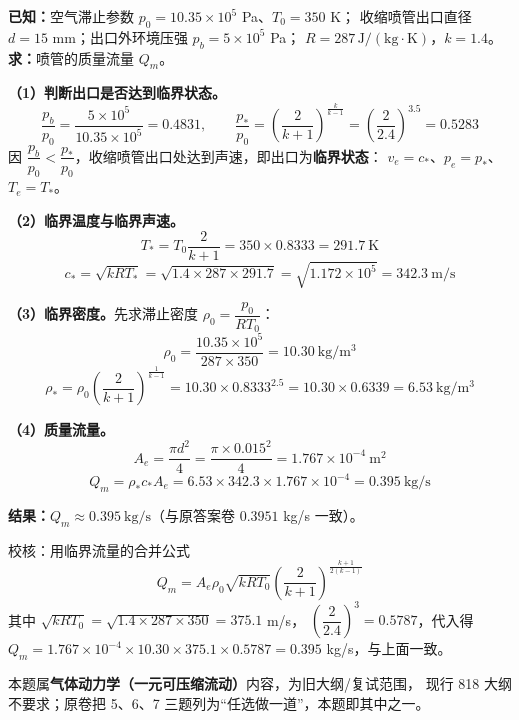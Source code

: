 \begin{jie}
\textbf{已知：}空气滞止参数 $p_0=10.35\times10^{5}$ Pa、$T_0=350$ K；
收缩喷管出口直径 $d=15$ mm；出口外环境压强 $p_b=5\times10^{5}$ Pa；
$R=287\,\mathrm{J/(kg\cdot K)}$，$k=1.4$。
\textbf{求：}喷管的质量流量 $Q_m$。

\textbf{（1）判断出口是否达到临界状态。}
\[
\frac{p_b}{p_0}=\frac{5\times10^{5}}{10.35\times10^{5}}=0.4831,
\qquad
\frac{p_*}{p_0}=\left(\frac{2}{k+1}\right)^{\frac{k}{k-1}}
=\left(\frac{2}{2.4}\right)^{3.5}=0.5283
\]
因 $\dfrac{p_b}{p_0}<\dfrac{p_*}{p_0}$，收缩喷管出口处达到声速，即出口为\textbf{临界状态}：
$v_e=c_*$、$p_e=p_*$、$T_e=T_*$。

\textbf{（2）临界温度与临界声速。}
\[
T_*=T_0\frac{2}{k+1}=350\times0.8333=291.7\ \mathrm{K}
\]
\[
c_*=\sqrt{kRT_*}=\sqrt{1.4\times287\times291.7}=\sqrt{1.172\times10^{5}}=342.3\ \mathrm{m/s}
\]

\textbf{（3）临界密度。}先求滞止密度 $\rho_0=\dfrac{p_0}{RT_0}$：
\[
\rho_0=\frac{10.35\times10^{5}}{287\times350}=10.30\ \mathrm{kg/m^{3}}
\]
\[
\rho_*=\rho_0\left(\frac{2}{k+1}\right)^{\frac{1}{k-1}}
=10.30\times0.8333^{2.5}=10.30\times0.6339=6.53\ \mathrm{kg/m^{3}}
\]

\textbf{（4）质量流量。}
\[
A_e=\frac{\pi d^{2}}{4}=\frac{\pi\times0.015^{2}}{4}=1.767\times10^{-4}\ \mathrm{m^{2}}
\]
\[
Q_m=\rho_*c_*A_e=6.53\times342.3\times1.767\times10^{-4}=0.395\ \mathrm{kg/s}
\]

\textbf{结果：}$\boxed{Q_m\approx0.395\ \mathrm{kg/s}}$（与原答案卷 $0.3951$ kg/s 一致）。

校核：用临界流量的合并公式
\[
Q_m=A_e\rho_0\sqrt{kRT_0}\left(\frac{2}{k+1}\right)^{\frac{k+1}{2(k-1)}}
\]
其中 $\sqrt{kRT_0}=\sqrt{1.4\times287\times350}=375.1$ m/s，
$\left(\dfrac{2}{2.4}\right)^{3}=0.5787$，代入得
$Q_m=1.767\times10^{-4}\times10.30\times375.1\times0.5787=0.395$ kg/s，与上面一致。
\end{jie}

\begin{tishi}
本题属\textbf{气体动力学（一元可压缩流动）}内容，为旧大纲/复试范围，
现行 818 大纲不要求；原卷把 5、6、7 三题列为“任选做一道”，本题即其中之一。
\end{tishi}


